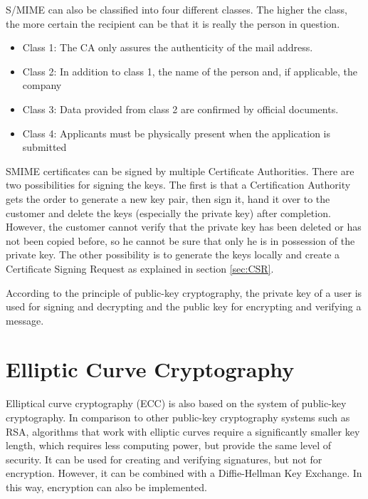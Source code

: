\documentclass[12pt,oneside,a4paper,parskip]{scrbook}
\begin{document}
S/MIME can also be classified into four different classes. The higher the class, the more certain the recipient can be that it is really the person in question.
\begin{itemize}
    \item Class 1: The CA only assures the authenticity of the mail address.
    \item Class 2: In addition to class 1, the name of the person and, if applicable, the company
    \item Class 3: Data provided from class 2 are confirmed by official documents.
    \item Class 4: Applicants must be physically present when the application is submitted
\end{itemize}

SMIME certificates can be signed by multiple Certificate Authorities. There are two possibilities for signing the keys. The first is that a Certification Authority gets the order to generate a new key pair, then sign it, hand it over to the customer and delete the keys (especially the private key) after completion. However, the customer cannot verify that the private key has been deleted or has not been copied before, so he cannot be sure that only he is in possession of the private key. The other possibility is to generate the keys locally and create a Certificate Signing Request as explained in section \ref{sec:CSR}.
\parencite{luber_smime_2018}

According to the principle of public-key cryptography, the private key of a user is used for signing and decrypting and the public key for encrypting and verifying a message.


\section{Elliptic Curve Cryptography}

Elliptical curve cryptography (ECC) is also based on the system of public-key cryptography. In comparison to other public-key cryptography systems such as RSA, algorithms that work with elliptic curves require a significantly smaller key length, which requires less computing power, but provide the same level of security. It can be used for creating and verifying signatures, but not for encryption. However, it can be combined with a Diffie-Hellman Key Exchange. In this way, encryption can also be implemented.
\parencite{hankerson_elliptic_2011}
\end{document}

